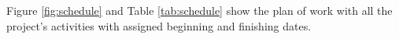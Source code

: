 \documentclass[conference]{IEEEtran}
\begin{document}
Figure \ref{fig:schedule} and Table \ref{tab:schedule} show the plan of work with all the project's activities with assigned beginning and finishing dates.


%
%



%
%
\end{document}
